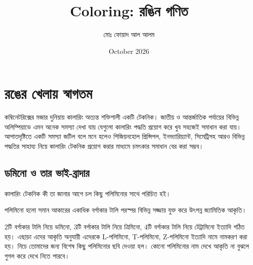 \documentclass[11pt]{report}
\title{Coloring: রঙিন গণিত}
\author{মোঃ ফোয়াদ আল আলম}
\date{October 2026}
\begin{document}
\pdfpageheight=11.25in
\pdfpagewidth=8in

\maketitle

\tableofcontents

\chapter{রঙের খেলায় স্বাগতম}
কম্বিনেটরিক্সের মজার দুনিয়ায় কালারিং অত্যন্ত শক্তিশালী একটি টেকনিক। জাতীয় ও আন্তর্জাতিক পর্যায়ের বিভিন্ন অলিম্পিয়াডে এমন অনেক সমস্যা দেখা যায় যেগুলো কালারিং পদ্ধতি প্রয়োগ করে খুব সহজেই সমাধান করা যায়। আপাতদৃষ্টিতে একটি সমস্যা জটিল বলে মনে হলেও পিজিয়নহোল প্রিন্সিপল, ইনভ্যারিয়্যান্ট, সিমেট্রিসহ আরও বিভিন্ন পদ্ধতির সাহায্য নিয়ে কালারিং টেকনিক প্রয়োগ করার মাধ্যমে চমৎকার সমাধান বের করা সম্ভব।

\section{ডমিনো ও তার ভাই-ব্রাদার}

কালারিং টেকনিক কী তা জানার আগে চল কিছু পলিমিনোর সাথে পরিচিত হই।\\

\begin{tcolorbox}[colframe=blue!80!blue]
পলিমিনো হলো সমান আকারের একাধিক বর্গাকার টালি পরস্পর বিভিন্ন সজ্জায় যুক্ত করে উৎপন্ন জ্যামিতিক আকৃতি।
\end{tcolorbox}

$2$টি বর্গাকার টালি নিয়ে ডমিনো, $3$টি বর্গাকার টালি নিয়ে ত্রিমিনো, $4$টি বর্গাকার টালি নিয়ে টেট্রামিনো ইত্যাদি গঠিত হয়। এছাড়া এদের আকৃতি অনুযায়ী এদেরকে L-পলিমিনো, T-পলিমিনো, Z-পলিমিনো ইত্যাদি নামে নামকরণ করা হয়। নিচে তোমাদের জন্য বিশেষ কিছু পলিমিনোর ছবি দেওয়া হল। কোনো পলিমিনোর নাম দেখে আকৃতি না বুঝলে গুগল করে দেখে নিতে পারবে।
\end{document}
